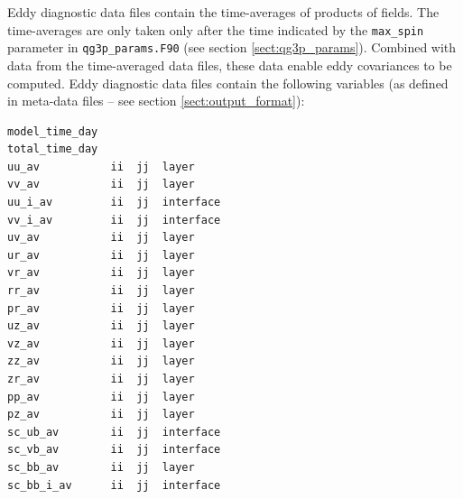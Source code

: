 \documentclass[a4paper]{book}
\begin{document}
Eddy diagnostic data files contain the time-averages of products of fields. The
time-averages are only taken only after the time indicated by the
\verb+max_spin+ parameter in \verb+qg3p_params.F90+ (see section
\ref{sect:qg3p_params}). Combined with data from the time-averaged data files,
these data enable eddy covariances to be computed. Eddy diagnostic data files
contain the following variables (as defined in meta-data files -- see section
\ref{sect:output_format}):
\begin{lstlisting}[language = bash, frame = single]
model_time_day
total_time_day
uu_av           ii  jj  layer
vv_av           ii  jj  layer
uu_i_av         ii  jj  interface
vv_i_av         ii  jj  interface
uv_av           ii  jj  layer
ur_av           ii  jj  layer
vr_av           ii  jj  layer
rr_av           ii  jj  layer
pr_av           ii  jj  layer
uz_av           ii  jj  layer
vz_av           ii  jj  layer
zz_av           ii  jj  layer
zr_av           ii  jj  layer
pp_av           ii  jj  layer
pz_av           ii  jj  layer
sc_ub_av        ii  jj  interface
sc_vb_av        ii  jj  interface
sc_bb_av        ii  jj  layer
sc_bb_i_av      ii  jj  interface
\end{lstlisting}
\end{document}
